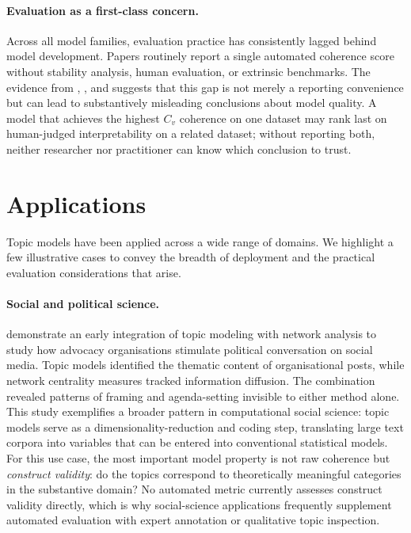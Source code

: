 \documentclass[11pt,a4paper]{article}
\begin{document}
\paragraph{Evaluation as a first-class concern.}
Across all model families, evaluation practice has consistently lagged
behind model development.
Papers routinely report a single automated coherence score without
stability analysis, human evaluation, or extrinsic benchmarks.
The evidence from \textcite{hoyle2021automated},
\textcite{doogan2021twaddle}, and \textcite{hoyle2022broken} suggests
that this gap is not merely a reporting convenience but can lead to
substantively misleading conclusions about model quality.
A model that achieves the highest $C_{v}$ coherence on one dataset may
rank last on human-judged interpretability on a related dataset;
without reporting both, neither researcher nor practitioner can know
which conclusion to trust.

\section{Applications}
\label{sec:applications}

Topic models have been applied across a wide range of domains.
We highlight a few illustrative cases to convey the breadth of
deployment and the practical evaluation considerations that arise.

\paragraph{Social and political science.}
\textcite{bail2016combining} demonstrate an early integration of topic
modeling with network analysis to study how advocacy organisations
stimulate political conversation on social media.
Topic models identified the thematic content of organisational posts,
while network centrality measures tracked information diffusion.
The combination revealed patterns of framing and agenda-setting
invisible to either method alone.
This study exemplifies a broader pattern in computational social science:
topic models serve as a dimensionality-reduction and coding step,
translating large text corpora into variables that can be entered into
conventional statistical models.
For this use case, the most important model property is not raw
coherence but \emph{construct validity}: do the topics correspond
to theoretically meaningful categories in the substantive domain?
No automated metric currently assesses construct validity directly,
which is why social-science applications frequently supplement
automated evaluation with expert annotation or qualitative
topic inspection.
\end{document}
